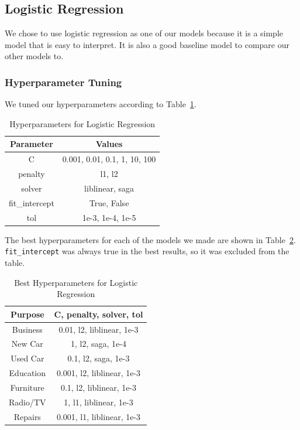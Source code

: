 \documentclass[12pt,twocolumn]{article}
\begin{document}
\subsection{Logistic Regression}

We chose to use logistic regression as one of our models because it is a simple model that is easy to interpret. It is also a good baseline model to compare our other models to. 
\subsubsection{Hyperparameter Tuning}
We tuned our hyperparameters according to Table~\ref{tab:logistic_regression_hyperparameters}. 
\begin{table}
    \centering
    \begin{tabular}{|c|c|}
        \hline
        Parameter & Values \\
        \hline
        \hline
        C & 0.001, 0.01, 0.1, 1, 10, 100 \\
        \hline
        penalty & l1, l2 \\
        \hline
        solver & liblinear, saga \\
        \hline
        fit\_intercept & True, False \\
        \hline
        tol & 1e-3, 1e-4, 1e-5 \\
        \hline
    \end{tabular}
    \caption{Hyperparameters for Logistic Regression}\label{tab:logistic_regression_hyperparameters}
\end{table}

The best hyperparameters for each of the models we made are shown in Table~\ref{tab:logistic_regression_best_hyperparameters}. \texttt{fit\_intercept} was always true in the best results, so it was excluded from the table.


\begin{table}
    \centering
    \begin{tabular}{|c|c|}
        \hline
        Purpose & C, penalty, solver, tol \\
        \hline
        \hline
        Business & 0.01, l2, liblinear, 1e-3 \\
        \hline
        New Car & 1, l2, saga, 1e-4 \\
        \hline
        Used Car & 0.1, l2, saga, 1e-3 \\
        \hline
        Education & 0.001, l2, liblinear, 1e-3 \\
        \hline
        Furniture & 0.1, l2, liblinear, 1e-3 \\
        \hline
        Radio/TV & 1, l1, liblinear, 1e-3 \\
        \hline
        Repairs & 0.001, l1, liblinear, 1e-3 \\
        \hline
    \end{tabular}
    \caption{Best Hyperparameters for Logistic Regression}\label{tab:logistic_regression_best_hyperparameters}
\end{table}
\end{document}
